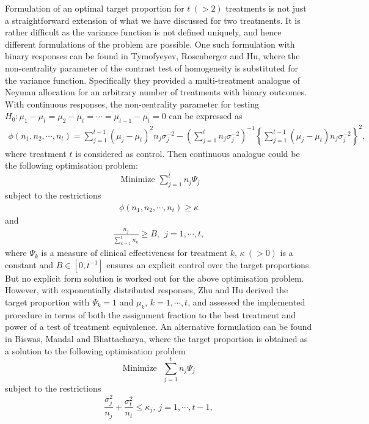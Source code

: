 Formulation of an optimal target proportion for $t~(>2)$ treatments is not just a straightforward extension of what we have discussed for two treatments. It is rather difficult as the variance function is not defined uniquely, and hence different formulations of the problem are possible. One such formulation with binary responses can be found in Tymofyeyev, Rosenberger and Hu\cite{50}, where the non-centrality parameter of the contrast test of homogeneity is substituted for the variance function. Specifically they provided a multi-treatment analogue of Neyman allocation for an arbitrary number of treatments with binary outcomes. With continuous responses, the non-centrality parameter for testing $H_{0}: \mu_{1}-\mu_{t}=\mu_{2}-\mu_{t}=\cdots =\mu_{t-1}-\mu_{t}=0$  can be expressed as
\begin{eqnarray*}
\phi(n_{1},n_{2},\cdots ,n_{t})=\sum_{j=1}^{t-1}(\mu_{j}-\mu_{t})^{2}n_{j}\sigma_{j}^{-2}-\left(\sum_{j=1}^{t}n_{j}\sigma_{j}^{-2}\right)^{-1}\left\{\sum_{j=1}^{t-1}(\mu_{j}-\mu_{t})n_{j}\sigma_{j}^{-2}\right\}^{2},
\end{eqnarray*}
where treatment $t$ is considered as control. Then continuous analogue  could be the following optimisation problem:
\begin{eqnarray*}
\mbox{~Minimize~} \sum_{j=1}^{t}n_{j}\Psi_{j}
\end{eqnarray*}
subject to the restrictions
\begin{eqnarray*}
\phi(n_{1},n_{2},\cdots ,n_{t})\geq \kappa
\end{eqnarray*}
and
\begin{eqnarray}
\frac{n_{j}}{\sum_{k=1}^{t}n_{k}}\geq B,~~ j=1,\cdots ,t,\label{B-intro}
\end{eqnarray}
where $\Psi_{k}$ is a measure of clinical effectiveness for treatment $k$, $\kappa~(>0)$ is a constant and $B\in[0,t^{-1}]$ ensures an explicit control over the target proportions. But no explicit form solution is worked out for the above optimisation problem. However, with exponentially distributed responses, Zhu and Hu\cite{51} derived the target proportion with $\Psi_{k}=1$ and $\mu_{k}$, $k=1,\cdots ,t$, and assessed the implemented procedure in terms of both the assignment fraction to the best treatment and power of a test of treatment equivalence. An alternative formulation can be found in Biswas, Mandal and Bhattacharya\cite{52}, where the target proportion is obtained as a solution to the  following optimisation problem
$$\mbox{Minimize~ } \sum_{j=1}^{t}n_{j}\Psi_{j}$$
subject to the restrictions
$$\frac{\sigma_{j}^{2}}{n_{j}}+\frac{\sigma_{t}^{2}}{n_{t}}\leq \kappa_{j}, ~j=1,\cdots ,t-1,$$
